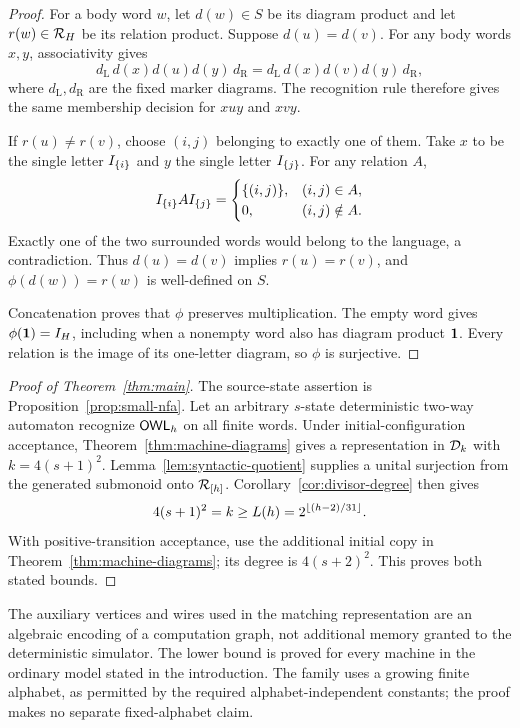 \begin{proof}
For a body word $w$, let $d(w)\in S$ be its diagram product and let
$r(w)\in\mathcal R_{H}$ be its relation product. Suppose $d(u)=d(v)$. For any
body words $x,y$, associativity gives
\[
 d_{\mathrm L}\,d(x)d(u)d(y)\,d_{\mathrm R}
 =d_{\mathrm L}\,d(x)d(v)d(y)\,d_{\mathrm R},
\]
where $d_{\mathrm L},d_{\mathrm R}$ are the fixed marker diagrams.
The recognition rule therefore gives the same membership decision for
$xuy$ and $xvy$.

If $r(u)\ne r(v)$, choose $(i,j)$ belonging to exactly one of them.
Take $x$ to be the single letter $I_{\{i\}}$ and $y$ the single letter
$I_{\{j\}}$. For any relation $A$,
\[
 I_{\{i\}}AI_{\{j\}}
 =\begin{cases}
   \{(i,j)\}, & (i,j)\in A,\\
   0, & (i,j)\notin A.
  \end{cases}
\]
Exactly one of the two surrounded words would belong to the language,
a contradiction. Thus $d(u)=d(v)$ implies $r(u)=r(v)$, and
$\phi(d(w))=r(w)$ is well-defined on $S$.

Concatenation proves that $\phi$ preserves multiplication. The empty
word gives $\phi(\mathbf 1)=I_{H}$, including when a nonempty word also
has diagram product $\mathbf 1$. Every relation is the image of its one-letter
diagram, so $\phi$ is surjective.
\end{proof}

\begin{proof}[Proof of Theorem~\ref{thm:main}]
The source-state assertion is Proposition~\ref{prop:small-nfa}.
Let an arbitrary $s$-state deterministic two-way automaton recognize
$\mathsf{OWL}_h$ on all finite words. Under initial-configuration acceptance,
Theorem~\ref{thm:machine-diagrams} gives a representation in
$\mathcal D_{k}$ with $k=4(s+1)^2$. Lemma~\ref{lem:syntactic-quotient} supplies
a unital surjection from the generated submonoid onto $\mathcal R_{[h]}$.
Corollary~\ref{cor:divisor-degree} then gives
\[
 4(s+1)^2=k\ge L(h)=2^{\lfloor(h-2)/31\rfloor}.
\]
With positive-transition acceptance, use the additional initial copy in
Theorem~\ref{thm:machine-diagrams}; its degree is $4(s+2)^2$.
This proves both stated bounds.
\end{proof}

\begin{remark}
The auxiliary vertices and wires used in the matching representation
are an algebraic encoding of a computation graph, not additional memory
granted to the deterministic simulator. The lower bound is proved for
every machine in the ordinary model stated in the introduction. The
family uses a growing finite alphabet, as permitted by the required
alphabet-independent constants; the proof makes no separate
fixed-alphabet claim.
\end{remark}
